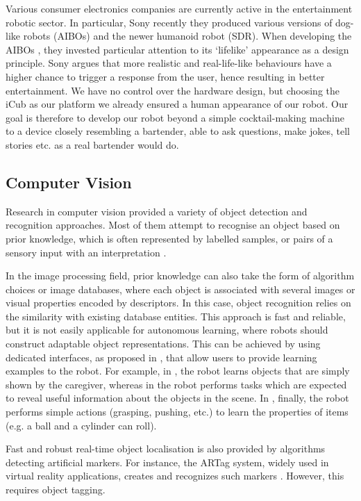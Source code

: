 \documentclass[conference]{IEEEtran}
\begin{document}
Various consumer electronics companies are currently active in the entertainment robotic sector. In particular, Sony recently they produced various versions of dog-like robots (AIBOs) and the newer humanoid robot (SDR). When developing the AIBOs \cite{petRobot}, they invested particular attention to its `lifelike' appearance as a design principle. Sony argues that more realistic and real-life-like behaviours have a higher chance to trigger a response from the user, hence resulting in better entertainment. We have no control over the hardware design, but choosing the iCub as our platform we already ensured a human appearance of our robot. Our goal is therefore to develop our robot beyond a simple cocktail-making machine to a device closely resembling a bartender, able to ask questions, make jokes, tell stories etc. as a real bartender would do.

\subsection{Computer Vision}

Research in computer vision provided a variety of object detection and recognition approaches. Most of them attempt to recognise an object based on prior knowledge, which is often represented by labelled samples, or pairs of a sensory input with an interpretation \cite{c1}.

In the image processing field, prior knowledge can also take the form of algorithm choices or image databases, where each object is associated with several images or visual properties encoded by descriptors. In this case, object recognition relies on the similarity with existing database entities. This approach is fast and reliable, but it is not easily applicable for autonomous learning, where robots should construct adaptable object representations. This can be achieved by using dedicated interfaces, as proposed in \cite{c2}, that allow users to provide learning examples to the robot. For example, in \cite{c3}, the robot learns objects that are simply shown by the caregiver, whereas in \cite{c4} the robot performs tasks which are expected to reveal useful information about the objects in the scene. In \cite{c5}, finally, the robot performs simple actions (grasping, pushing, etc.) to learn the properties of items (e.g. a ball and a cylinder can roll).

Fast and robust real-time object localisation is also provided by algorithms detecting artificial markers. For instance, the ARTag system, widely used in virtual reality applications, creates and recognizes such markers \cite{c6}. However, this requires object tagging.
\end{document}

